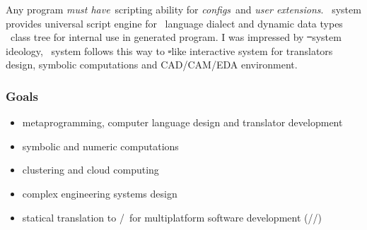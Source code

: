 
Any program \emph{must have}\ scripting ability for \emph{configs}\ and 
\emph{user extensions}. \bi\ system provides universal script engine for
\bi\ language dialect and dynamic data types \cpp\ class tree
for internal use in generated program.
I was impressed by \st\ system ideology, \bi\ system follows this way to
\st-like interactive system for translators design, symbolic computations and
CAD/CAM/EDA environment.

\subsubsection{Goals}

\begin{itemize}[nosep]
\item metaprogramming, computer language design and translator development
\item symbolic and numeric computations
\item clustering and cloud computing
\item complex engineering systems design
\item statical translation to \cpp/\java\ for multiplatform software development
(\win/\lin/\andr) 
\end{itemize}